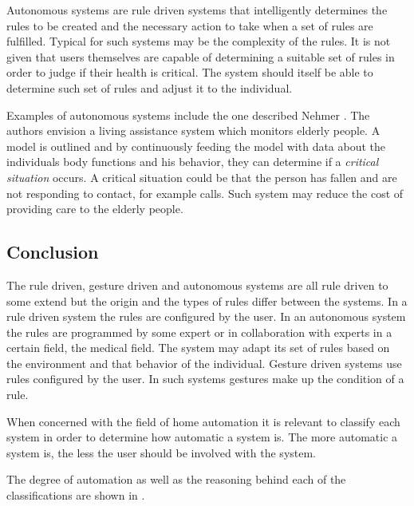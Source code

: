 Autonomous systems are rule driven systems that intelligently determines the rules to be created and the necessary action to take when a set of rules are fulfilled. 
Typical for such systems may be the complexity of the rules. 
It is not given that users themselves are capable of determining a suitable set of rules in order to judge if their health is critical. 
The system should itself be able to determine such set of rules and adjust it to the individual.

Examples of autonomous systems include the one described Nehmer \etal\cite{nehmer2006living}. 
The authors envision a living assistance system which monitors elderly people. 
A model is outlined and by continuously feeding the model with data about the individuals body functions and his behavior, 
they can determine if a \emph{critical situation} occurs. 
A critical situation could be that the person has fallen and are not responding to contact, for example calls.
Such system may reduce the cost of providing care to the elderly people.

\subsection{Conclusion}

The rule driven, gesture driven and autonomous systems are all rule driven to some extend but the origin and the types of rules differ between the systems. 
In a rule driven system the rules are configured by the user.
In an autonomous system the rules are programmed by some expert or in collaboration with experts in a certain field, \eg the medical field. 
The system may adapt its set of rules based on the environment and that behavior of the individual.
Gesture driven systems use rules configured by the user. 
In such systems gestures make up the condition of a rule.

When concerned with the field of home automation it is relevant to classify each system in order to determine how automatic a system is. 
The more automatic a system is, the less the user should be involved with the system.

The degree of automation as well as the reasoning behind each of the classifications are shown in .

